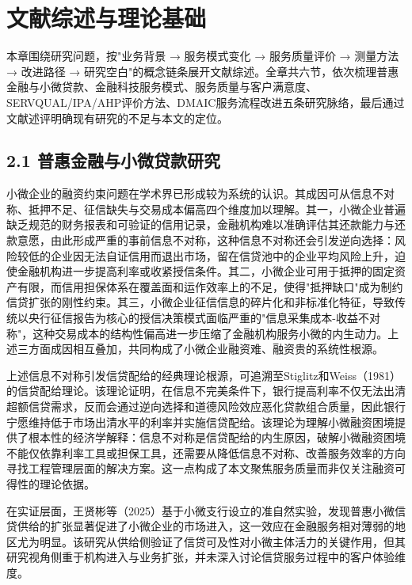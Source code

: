 \chapter{文献综述与理论基础}

本章围绕研究问题，按"业务背景 → 服务模式变化 → 服务质量评价 → 测量方法 → 改进路径 → 研究空白"的概念链条展开文献综述。全章共六节，依次梳理普惠金融与小微贷款、金融科技服务模式、服务质量与客户满意度、SERVQUAL/IPA/AHP评价方法、DMAIC服务流程改进五条研究脉络，最后通过文献述评明确现有研究的不足与本文的定位。\par

\section{2.1 普惠金融与小微贷款研究}

小微企业的融资约束问题在学术界已形成较为系统的认识。其成因可从信息不对称、抵押不足、征信缺失与交易成本偏高四个维度加以理解。其一，小微企业普遍缺乏规范的财务报表和可验证的信用记录，金融机构难以准确评估其还款能力与还款意愿，由此形成严重的事前信息不对称，这种信息不对称还会引发逆向选择：风险较低的企业因无法自证信用而退出市场，留在信贷池中的企业平均风险上升，迫使金融机构进一步提高利率或收紧授信条件。其二，小微企业可用于抵押的固定资产有限，而信用担保体系在覆盖面和运作效率上的不足，使得"抵押缺口"成为制约信贷扩张的刚性约束。其三，小微企业征信信息的碎片化和非标准化特征，导致传统以央行征信报告为核心的授信决策模式面临严重的"信息采集成本-收益不对称"，这种交易成本的结构性偏高进一步压缩了金融机构服务小微的内生动力。上述三方面成因相互叠加，共同构成了小微企业融资难、融资贵的系统性根源。\par

上述信息不对称引发信贷配给的经典理论根源，可追溯至Stiglitz和Weiss（1981）的信贷配给理论\cite{ref17}。该理论证明，在信息不完美条件下，银行提高利率不仅无法出清超额信贷需求，反而会通过逆向选择和道德风险效应恶化贷款组合质量，因此银行宁愿维持低于市场出清水平的利率并实施信贷配给。该理论为理解小微融资困境提供了根本性的经济学解释：信息不对称是信贷配给的内生原因，破解小微融资困境不能仅依靠利率工具或担保工具，还需要从降低信息不对称、改善服务效率的方向寻找工程管理层面的解决方案。这一点构成了本文聚焦服务质量而非仅关注融资可得性的理论依据。\par

在实证层面，王贤彬等（2025）基于小微支行设立的准自然实验，发现普惠小微信贷供给的扩张显著促进了小微企业的市场进入，这一效应在金融服务相对薄弱的地区尤为明显\cite{ref2}。该研究从供给侧验证了信贷可及性对小微主体活力的关键作用，但其研究视角侧重于机构进入与业务扩张，并未深入讨论信贷服务过程中的客户体验维度。\par

